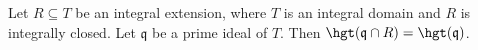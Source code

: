 Let $R \subseteq T$ be an integral extension, where $T$ is an integral domain
and $R$ is integrally closed.  Let $\mathfrak{q}$ be a prime ideal of $T$.
Then $\hgt(\mathfrak{q}\cap R) = \hgt(\mathfrak{q})$.
